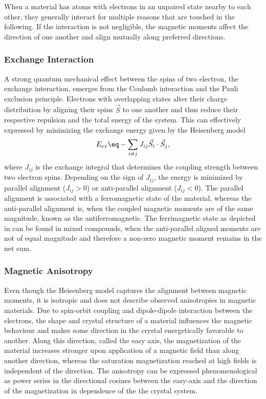 \documentclass[\main/dresen_thesis.tex]{subfiles}
\begin{document}
      When a material has atoms with electrons in an unpaired state nearby to each other, they generally interact for multiple reasons that are touched in the following.
      If the interaction is not negligible, the magnetic moments affect the direction of one another and align mutually along preferred directions.
      \subsubsection{Exchange Interaction}
        A strong quantum mechanical effect between the spins of two electron, the exchange interaction, emerges from the Coulomb interaction and the Pauli exclusion principle.
        Electrons with overlapping states alter their charge distribution by aligning their spins $\vec{S}$ to one another and thus reduce their respective repulsion and the total energy of the system.
        This can effectively expressed by minimizing the exchange energy given by the Heisenberg model
        \begin{align}
          E_{ex} \eq -\sum_{i \neq j} J_{ij} \vec{S}_i \cdot \vec{S}_j,
        \end{align}
        where $J_{ij}$ is the exchange integral that determines the coupling strength between two electron spins.
        Depending on the sign of $J_{ij}$, the energy is minimized by parallel alignment ($J_{ij} > 0$) or anti-parallel alignment ($J_{ij} < 0$).
        The parallel alignment is associated with a ferromagnetic state of the material, whereas the anti-parallel alignment is, when the coupled magnetic moments are of the same magnitude, known as the antiferromagnetic.
        The ferrimagnetic state as depicted in  can be found in mixed compounds, when the anti-parallel aligned moments are not of equal magnitude and therefore a non-zero magnetic moment remains in the net sum.

      \subsubsection{Magnetic Anisotropy}
        Even though the Heisenberg model captures the alignment between magnetic moments, it is isotropic and does not describe observed anisotropies in magnetic materials.
        Due to spin-orbit coupling and dipole-dipole interaction between the electrons, the shape and crystal structure of a material influences the magnetic behaviour and makes some direction in the crystal energetically favorable to another.
        Along this direction, called the easy axis, the magnetization of the material increases stronger upon application of a magnetic field than along another direction, whereas the saturation magnetization reached at high fields is independent of the direction.
        The anisotropy can be expressed phenomenological as power series in the directional cosines between the easy-axis and the direction of the magnetization in dependence of the the crystal system.
\end{document}
